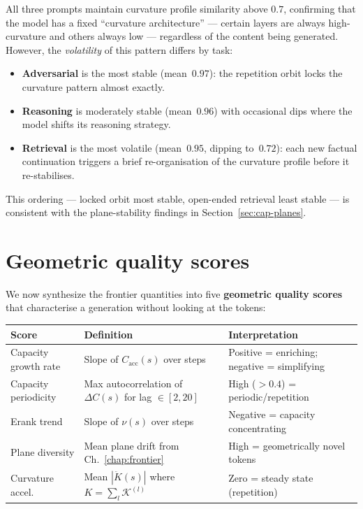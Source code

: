 \documentclass[11pt, twoside, openright]{memoir}
\numberwithin{equation}{chapter}
\begin{document}
\begin{finding}
All three prompts maintain curvature profile similarity above $0.7$,
confirming that the model has a fixed ``curvature architecture'' ---
certain layers are always high-curvature and others always low ---
regardless of the content being generated.  However, the
\emph{volatility} of this pattern differs by task:

\begin{itemize}[nosep]
\item \textbf{Adversarial} is the most stable (mean~$0.97$):
  the repetition orbit locks the curvature pattern almost exactly.
\item \textbf{Reasoning} is moderately stable (mean~$0.96$) with
  occasional dips where the model shifts its reasoning strategy.
\item \textbf{Retrieval} is the most volatile (mean~$0.95$, dipping
  to~$0.72$): each new factual continuation triggers a brief
  re-organisation of the curvature profile before it re-stabilises.
\end{itemize}

This ordering --- locked orbit most stable, open-ended retrieval
least stable --- is consistent with the plane-stability findings in
Section~\ref{sec:cap-planes}.
\end{finding}


\section{Geometric quality scores}
\label{sec:cap-quality}

We now synthesize the frontier quantities into five
\textbf{geometric quality scores} that characterise a generation
without looking at the tokens:

\begin{center}
\renewcommand{\arraystretch}{1.4}\small
\begin{tabular}{@{}L{3cm} L{5cm} L{4cm}@{}}
\toprule
\textbf{Score} & \textbf{Definition} & \textbf{Interpretation} \\
\midrule
Capacity growth rate &
  Slope of $C_{\mathrm{acc}}(s)$ over steps &
  Positive = enriching; negative = simplifying \\
Capacity periodicity &
  Max autocorrelation of $\Delta C(s)$ for
  lag $\in [2, 20]$ &
  High ($> 0.4$) = periodic/repetition \\
Erank trend &
  Slope of $\nu(s)$ over steps &
  Negative = capacity concentrating \\
Plane diversity &
  Mean plane drift from Ch.~\ref{chap:frontier} &
  High = geometrically novel tokens \\
Curvature accel. &
  Mean $|\ddot{K}(s)|$ where
  $K = \sum_l \mathcal{K}^{(l)}$ &
  Zero = steady state (repetition) \\
\bottomrule
\end{tabular}
\end{center}
\end{document}
